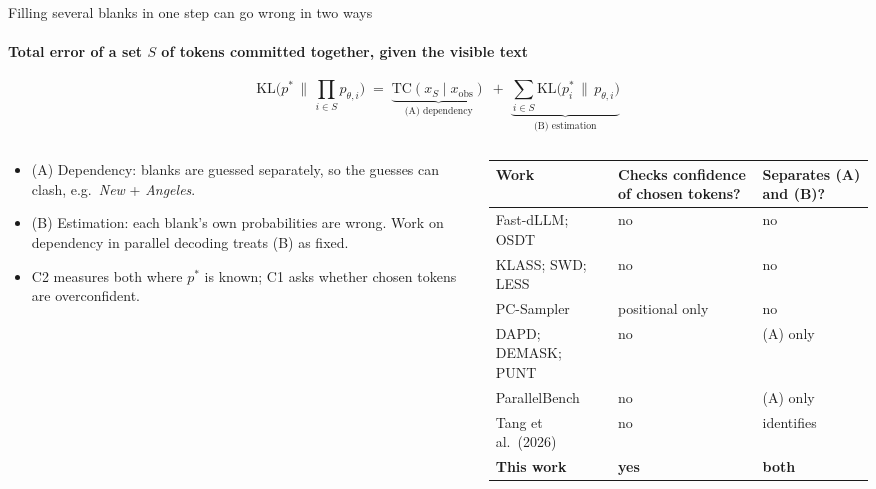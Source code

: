 \documentclass[aspectratio=169,10pt,t]{beamer}
\newcommand{\A}{{\color{dep}\firasemibold (A)}\xspace}
\newcommand{\B}{{\color{est}\firasemibold (B)}\xspace}
\begin{document}
\begin{frame}{Filling several blanks in one step can go wrong in two ways}
  \framesubtitle{Total error of a set $S$ of tokens committed together, given the visible text}
  \vspace{-2.5mm}
  \[
    \mathrm{KL}\Big(p^{*} \,\Big\|\, \prod_{i\in S} p_{\theta,i}\Big)
    \;=\; \underbrace{\mathrm{TC}(x_S \mid x_{\mathrm{obs}})}_{\text{(A) dependency}}
    \;+\; \underbrace{\sum_{i\in S} \mathrm{KL}\big(p^{*}_i \,\big\|\, p_{\theta,i}\big)}_{\text{(B) estimation}}
  \]
  \vspace{-1mm}
  \begin{columns}[T,onlytextwidth]
    \begin{column}{0.4\textwidth}
      \begin{itemize}
        \item \A Dependency: blanks are guessed separately, so the guesses can clash,
              e.g.\ \emph{New} + \emph{Angeles}.
        \item \B Estimation: each blank's own probabilities are wrong. Work on dependency
              in parallel decoding treats \B as fixed.
        \item C2 measures both where $p^{*}$ is known; C1 asks whether chosen tokens are
              overconfident.
      \end{itemize}
    \end{column}
    \begin{column}{0.57\textwidth}
      \scriptsize
      \renewcommand{\arraystretch}{1.12}
      \begin{tabularx}{\linewidth}{@{}p{2.9cm} >{\centering\arraybackslash}X >{\centering\arraybackslash}X@{}}
        \toprule
        {\color{ink2}Work} & {\color{ink2}Checks confidence of chosen tokens?} & {\color{ink2}Separates (A) and (B)?} \\
        \midrule
        Fast-dLLM; OSDT             & no              & no \\
        KLASS; SWD; LESS            & no              & no \\
        PC-Sampler                  & positional only & no \\
        DAPD; DEMASK; PUNT          & no              & (A) only \\
        ParallelBench               & no              & (A) only \\
        Tang et al.\ (2026)         & no              & identifies \\
        \rowcolor{wash}
        \textbf{This work}          & \textbf{yes}    & \textbf{both} \\
        \bottomrule
      \end{tabularx}
    \end{column}
  \end{columns}
\end{frame}
\end{document}
